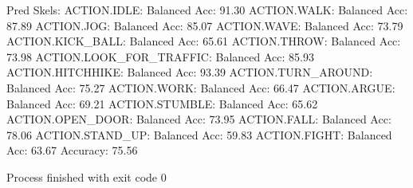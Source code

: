 Pred Skels:
ACTION.IDLE: Balanced Acc: 91.30%
ACTION.WALK: Balanced Acc: 87.89%
ACTION.JOG: Balanced Acc: 85.07%
ACTION.WAVE: Balanced Acc: 73.79%
ACTION.KICK_BALL: Balanced Acc: 65.61%
ACTION.THROW: Balanced Acc: 73.98%
ACTION.LOOK_FOR_TRAFFIC: Balanced Acc: 85.93%
ACTION.HITCHHIKE: Balanced Acc: 93.39%
ACTION.TURN_AROUND: Balanced Acc: 75.27%
ACTION.WORK: Balanced Acc: 66.47%
ACTION.ARGUE: Balanced Acc: 69.21%
ACTION.STUMBLE: Balanced Acc: 65.62%
ACTION.OPEN_DOOR: Balanced Acc: 73.95%
ACTION.FALL: Balanced Acc: 78.06%
ACTION.STAND_UP: Balanced Acc: 59.83%
ACTION.FIGHT: Balanced Acc: 63.67%
Accuracy: 75.56%

Process finished with exit code 0

